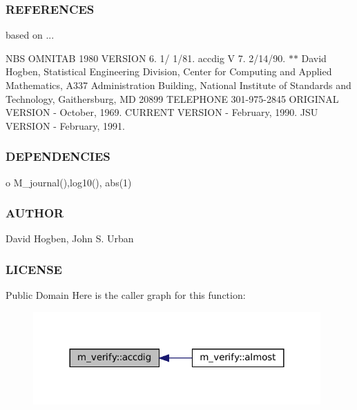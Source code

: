 \subsubsection*{R\+E\+F\+E\+R\+E\+N\+C\+ES}

based on ...

N\+BS O\+M\+N\+I\+T\+AB 1980 V\+E\+R\+S\+I\+ON 6. 1/ 1/81. accdig V 7. 2/14/90. $\ast$$\ast$ David Hogben, Statistical Engineering Division, Center for Computing and Applied Mathematics, A337 Administration Building, National Institute of Standards and Technology, Gaithersburg, MD 20899 T\+E\+L\+E\+P\+H\+O\+NE 301-\/975-\/2845 O\+R\+I\+G\+I\+N\+AL V\+E\+R\+S\+I\+ON -\/ October, 1969. C\+U\+R\+R\+E\+NT V\+E\+R\+S\+I\+ON -\/ February, 1990. J\+SU V\+E\+R\+S\+I\+ON -\/ February, 1991.

\subsubsection*{D\+E\+P\+E\+N\+D\+E\+N\+C\+I\+ES}

o M\+\_\+journal(),log10(), abs(1)

\subsubsection*{A\+U\+T\+H\+OR}

David Hogben, John S. Urban

\subsubsection*{L\+I\+C\+E\+N\+SE}

Public Domain Here is the caller graph for this function\+:\nopagebreak
\begin{figure}[H]
\begin{center}
\leavevmode
\includegraphics[width=312pt]{namespacem__verify_a311d01ea90882e4db1e87520ba731d5c_icgraph}
\end{center}
\end{figure}
\mbox{\label{namespacem__verify_ac5b0a0323929702a4b9e3fb918ea19b3}} 
